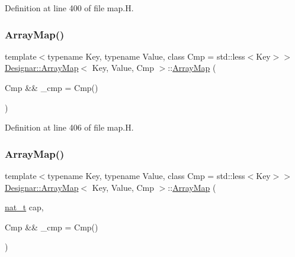 Definition at line 400 of file map.\+H.

\mbox{\label{class_designar_1_1_array_map_ac7113b782b6ade75f5ccc843ecc2c153}} 
\subsubsection{\texorpdfstring{Array\+Map()}{ArrayMap()}\hspace{0.1cm}{\footnotesize\ttfamily [2/6]}}
{\footnotesize\ttfamily template$<$typename Key, typename Value, class Cmp = std\+::less$<$\+Key$>$$>$ \\
\hyperlink{class_designar_1_1_array_map}{Designar\+::\+Array\+Map}$<$ Key, Value, Cmp $>$\+::\hyperlink{class_designar_1_1_array_map}{Array\+Map} (\begin{DoxyParamCaption}\item[{Cmp \&\&}]{\+\_\+cmp = {\ttfamily Cmp()} }\end{DoxyParamCaption})\hspace{0.3cm}{\ttfamily [inline]}}



Definition at line 406 of file map.\+H.

\mbox{\label{class_designar_1_1_array_map_a553f96874d7e4037c333edd6dd76ba31}} 
\subsubsection{\texorpdfstring{Array\+Map()}{ArrayMap()}\hspace{0.1cm}{\footnotesize\ttfamily [3/6]}}
{\footnotesize\ttfamily template$<$typename Key, typename Value, class Cmp = std\+::less$<$\+Key$>$$>$ \\
\hyperlink{class_designar_1_1_array_map}{Designar\+::\+Array\+Map}$<$ Key, Value, Cmp $>$\+::\hyperlink{class_designar_1_1_array_map}{Array\+Map} (\begin{DoxyParamCaption}\item[{\hyperlink{namespace_designar_aa72662848b9f4815e7bf31a7cf3e33d1}{nat\+\_\+t}}]{cap,  }\item[{Cmp \&\&}]{\+\_\+cmp = {\ttfamily Cmp()} }\end{DoxyParamCaption})\hspace{0.3cm}{\ttfamily [inline]}}



